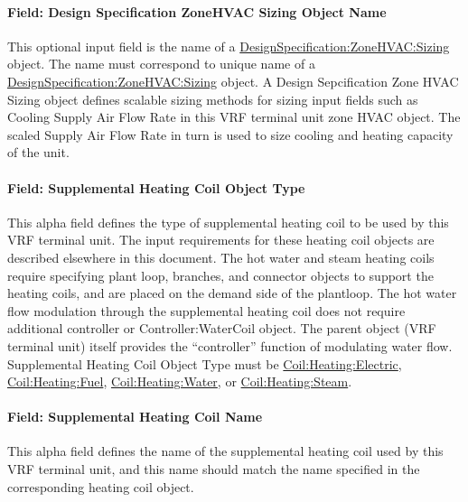 \paragraph{Field: Design Specification ZoneHVAC Sizing Object Name}\label{field-design-specification-zonehvac-sizing-object-name-9}

This optional input field is the name of a \hyperref[designspecificationzonehvacsizing]{DesignSpecification:ZoneHVAC:Sizing} object. The name must correspond to unique name of a \hyperref[designspecificationzonehvacsizing]{DesignSpecification:ZoneHVAC:Sizing} object. A Design Sepcification Zone HVAC Sizing object defines scalable sizing methods for sizing input fields such as Cooling Supply Air Flow Rate in this VRF terminal unit zone HVAC object. The scaled Supply Air Flow Rate in turn is used to size cooling and heating capacity of the unit.

\paragraph{Field: Supplemental Heating Coil Object Type}\label{field-supplemental-heating-coil-object-type-2-000}

This alpha field defines the type of supplemental heating coil to be used by this VRF terminal unit. The input requirements for these heating coil objects are described elsewhere in this document. The hot water and steam heating coils require specifying plant loop, branches, and connector objects to support the heating coils, and are placed on the demand side of the plantloop. The hot water flow modulation through the supplemental heating coil does not require additional controller or Controller:WaterCoil object. The parent object (VRF terminal unit) itself provides the “controller” function of modulating water flow. Supplemental Heating Coil Object Type must be \hyperref[coilheatingelectric]{Coil:Heating:Electric}, \hyperref[coilheatinggas-000]{Coil:Heating:Fuel}, \hyperref[coilheatingwater]{Coil:Heating:Water}, or \hyperref[coilheatingsteam]{Coil:Heating:Steam}.

\paragraph{Field: Supplemental Heating Coil Name}\label{field-supplemental-heating-coil-name-2-000}

This alpha field defines the name of the supplemental heating coil used by this VRF terminal unit, and this name should match the name specified in the corresponding heating coil object.


